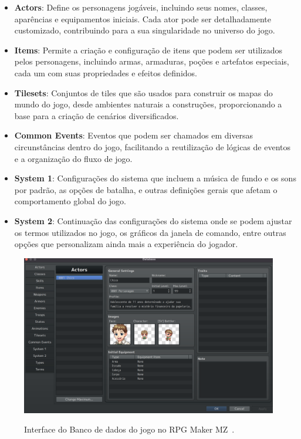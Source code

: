 \begin{itemize}
	\item \textbf{Actors}: Define os personagens jogáveis, incluindo seus nomes, classes, aparências e equipamentos iniciais. Cada ator pode ser detalhadamente customizado, contribuindo para a sua singularidade no universo do jogo.
	\item \textbf{Items}: Permite a criação e configuração de itens que podem ser utilizados pelos personagens, incluindo armas, armaduras, poções e artefatos especiais, cada um com suas propriedades e efeitos definidos.
	\item \textbf{Tilesets}: Conjuntos de tiles que são usados para construir os mapas do mundo do jogo, desde ambientes naturais a construções, proporcionando a base para a criação de cenários diversificados.
	\item \textbf{Common Events}: Eventos que podem ser chamados em diversas circunstâncias dentro do jogo, facilitando a reutilização de lógicas de eventos e a organização do fluxo de jogo.
	\item \textbf{System 1}: Configurações do sistema que incluem a música de fundo e os sons por padrão, as opções de batalha, e outras definições gerais que afetam o comportamento global do jogo.
	\item \textbf{System 2}: Continuação das configurações do sistema onde se podem ajustar os termos utilizados no jogo, os gráficos da janela de comando, entre outras opções que personalizam ainda mais a experiência do jogador.
\end{itemize}

\begin{figure}[ht]
	\centering
	\caption{Interface do Banco de dados do jogo no RPG Maker MZ~\cite{RPGMakerMZ}.}
	\includegraphics[scale=0.2]{Textuais/Pictures/DataBase.png}
	\label{fig:rpgmaker-interface-database}
\end{figure}

